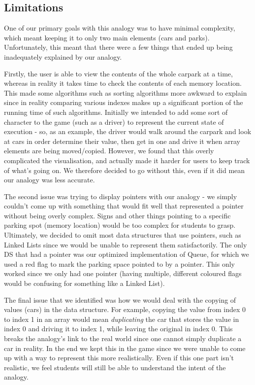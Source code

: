\documentclass[11pt]{article}
\begin{document}
\subsection{Limitations}
\label{analogyLimits}
One of our primary goals with this analogy was to have minimal complexity, which meant keeping it to only two main elements (cars and parks). Unfortunately, this meant that there were a few things that ended up being inadequately explained by our analogy.\par
Firstly, the user is able to view the contents of the whole carpark at a time, whereas in reality it takes time to check the contents of each memory location. This made some algorithms such as sorting algorithms more awkward to explain since in reality comparing various indexes makes up a significant portion of the running time of such algorithms. Initially we intended to add some sort of character to the game (such as a driver) to represent the current state of execution - so, as an example, the driver would walk around the carpark and look at cars in order determine their value, then get in one and drive it when array elements are being moved/copied. However, we found that this overly complicated the visualisation, and actually made it harder for users to keep track of what's going on. We therefore decided to go without this, even if it did mean our analogy was less accurate.\par
The second issue was trying to display pointers with our analogy - we simply couldn't come up with something that would fit well that represented a pointer without being overly complex. Signs and other things pointing to a specific parking spot (memory location) would be too complex for students to grasp. Ultimately, we decided to omit most data structures that use pointers, such as Linked Lists since we would be unable to represent them satisfactorily. The only DS that had a pointer was our optimized implementation of Queue, for which we used a red flag to mark the parking space pointed to by a pointer. This only worked since we only had one pointer (having multiple, different coloured flags would be confusing for something like a Linked List).\par
The final issue that we identified was how we would deal with the copying of values (cars) in the data structure. For example, copying the value from index 0 to index 1 in an array would mean \emph{duplicating} the car that stores the value in index 0 and driving it to index 1, while leaving the original in index 0. This breaks the analogy's link to the real world since one cannot simply duplicate a car in reality. In the end we kept this in the game since we were unable to come up with a way to represent this more realistically. Even if this one part isn't realistic, we feel students will still be able to understand the intent of the analogy.
\end{document}
